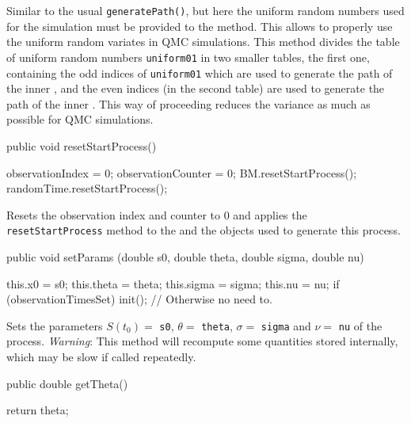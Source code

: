 \begin{tabb} Similar to the usual \texttt{generatePath()}, but here the uniform
random numbers used for the simulation must be provided to the method.  This
allows to properly use the uniform random variates in QMC simulations.
This method divides the table of uniform random
numbers \texttt{uniform01} in two smaller tables, the first one, containing the
odd indices of \texttt{uniform01} which are used to generate the path of the inner
, and the even indices (in the second table) are used to
generate the path of the inner . This way of proceeding
reduces the variance as much as possible for QMC simulations.
\end{tabb}
\begin{code}

    public void resetStartProcess() \begin{hide} {
        observationIndex   = 0;
        observationCounter = 0;
        BM.resetStartProcess();
        randomTime.resetStartProcess();
    }\end{hide}
\end{code}
\begin{tabb} Resets the observation index and counter to 0 and
applies the \texttt{resetStartProcess} method to the
 and the  objects
used to generate this process.
\end{tabb}
\begin{code}

   public void setParams (double s0, double theta, double sigma, double nu) \begin{hide} {
        this.x0    = s0;
        this.theta = theta;
        this.sigma = sigma;
        this.nu    = nu;
        if (observationTimesSet) init(); // Otherwise no need to.
    }\end{hide}
\end{code}
\begin{tabb}
Sets the parameters
$S(t_{0}) =$ \texttt{s0}, $\theta =$ \texttt{theta}, $\sigma =$ \texttt{sigma}
and $\nu =$ \texttt{nu} of the process.
\emph{Warning}: This method will recompute some quantities stored internally,
which may be slow if called repeatedly.
\end{tabb}
\begin{code}

   public double getTheta() \begin{hide} { return theta; }\end{hide}
\end{code}
